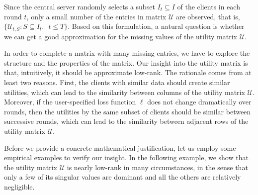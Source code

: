 Since the central server randomly selects a subset $I_t \subseteq I$ of the clients in each round $t$, only a small number of the entries in matrix $\mathcal{U}$ are observed, that is, 
$\{\mathcal{U}_{t, S}: S \subseteq I_t, \enspace t \leq T\}$.
Based on this formulation, a natural question is whether we can get a good approximation for the missing values of the utility matrix $\mathcal{U}$. 

In order to complete a matrix with many missing entries, we have to explore the structure and the properties of the matrix. Our insight into the utility matrix is that, intuitively, it should be approximate low-rank. The rationale comes from at least two reasons. First, the clients with similar data should create similar utilities, which can lead to the similarity between columns of the utility matrix $\mathcal{U}$.  Moreover, if the user-specified loss function $\ell$ does not change dramatically over rounds, then the utilities by the same subset of clients should be similar between successive rounds, which can lead to the similarity between adjacent rows of the utility matrix $\mathcal{U}$.

Before we provide a concrete mathematical justification, let us employ some empirical examples to verify our insight. In the following example, we show that the utility matrix $\mathcal{U}$ is nearly low-rank in many circumstances, in the sense that only a few of its singular values are dominant and all the others are relatively negligible. 

